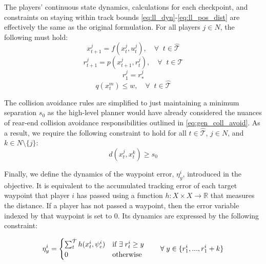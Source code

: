 The players' continuous state dynamics, calculations for each checkpoint, and constraints on staying within track bounds \eqref{eq:ll_dyn}-\eqref{eq:ll_pos_dist} are effectively the same as the original formulation. For all players $j \in N$, the following must hold:
\begin{equation} \label{eq:ll_dyn}
    x^j_{t+1} = f(x^j_{t}, u^j_t), \quad \forall \;\; t \in \hat{\mathcal{T}}
\end{equation}
\begin{equation} \label{eq::ll_pos}
    r^j_{t+1} = p(x^j_{t+1}, r^j_t), \quad \forall \;\; t \in \hat{\mathcal{T}}
\end{equation}
\begin{equation} \label{eq::ll_pos_init}
    r^j_{1} = r^j_*
\end{equation}
\begin{equation} \label{eq:ll_pos_dist}
    q(x^m_{t}) \leq w, \quad \forall \;\; t \in \hat{\mathcal{T}}
\end{equation}

The collision avoidance rules are simplified to just maintaining a minimum separation $s_0$ as the high-level planner would have already considered the nuances of rear-end collision avoidance responsibilities outlined in \eqref{eq:gen_coll_avoid}. As a result, we require the following constraint to hold for all $t \in \hat{\mathcal{T}}$, $j \in N$, and $k \in N \setminus \{j\}$:
\begin{equation} \label{eq:ll_coll_avoid}
    d(x^j_{t}, x^k_t) \geq s_0
\end{equation}

Finally, we define the dynamics of the waypoint error, $\eta^i_y$, introduced in the objective. It is equivalent to the accumulated tracking error of each target waypoint that player $i$ has passed using a function $h: X\times X \rightarrow \mathbb{R}$ that measures the distance. If a player has not passed a waypoint, then the error variable indexed by that waypoint is set to 0. Its dynamics are expressed by the following constraint:

\begin{equation} \label{eq:ll_wp_err}
    \eta^i_y = \begin{cases} \sum_{t}^{\Hat{\mathcal{T}}} h(x^i_t, \psi^i_{c})  & \text{if } \exists \; r^i_t \geq y \\
    0 & \text{otherwise}
    \end{cases} \qquad \forall \; y \in \{r^i_{1}, ..., r^i_{1} + k\}
\end{equation}

